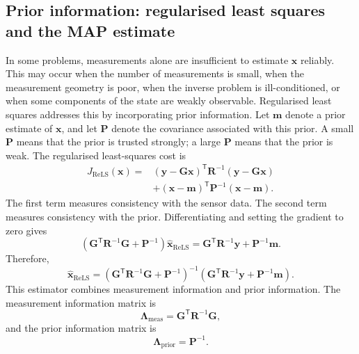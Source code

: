 \documentclass[11pt,oneside,openany]{book}
\begin{document}
\subsection{Prior information: regularised least squares and the MAP estimate}
In some problems, measurements alone are insufficient to estimate $\mathbf{x}$ reliably. This may occur when the number of measurements is small, when the measurement geometry is poor, when the inverse problem is ill-conditioned, or when some components of the state are weakly observable. Regularised least squares addresses this by incorporating prior information. Let $\mathbf{m}$ denote a prior estimate of $\mathbf{x}$, and let $\mathbf{P}$ denote the covariance associated with this prior. A small $\mathbf{P}$ means that the prior is trusted strongly; a large $\mathbf{P}$ means that the prior is weak. The regularised least-squares cost is
\begin{align}
J_{\mathrm{ReLS}}(\mathbf{x})
=&
\left(
\mathbf{y}
-
\mathbf{G}\mathbf{x}
\right)^{\mathsf T}
\mathbf{R}^{-1}
\left(
\mathbf{y}
-
\mathbf{G}\mathbf{x}
\right) \nonumber \\
&+
\left(
\mathbf{x}
-
\mathbf{m}
\right)^{\mathsf T}
\mathbf{P}^{-1}
\left(
\mathbf{x}
-
\mathbf{m}
\right).
\end{align}
The first term measures consistency with the sensor data. The second term measures consistency with the prior. Differentiating and setting the gradient to zero gives
\begin{equation}
\left(
\mathbf{G}^{\mathsf T}
\mathbf{R}^{-1}
\mathbf{G}
+
\mathbf{P}^{-1}
\right)
\widehat{\mathbf{x}}_{\mathrm{ReLS}}
=
\mathbf{G}^{\mathsf T}
\mathbf{R}^{-1}
\mathbf{y}
+
\mathbf{P}^{-1}
\mathbf{m}.
\end{equation}
Therefore,
\begin{equation}
\widehat{\mathbf{x}}_{\mathrm{ReLS}}
=
\left(
\mathbf{G}^{\mathsf T}
\mathbf{R}^{-1}
\mathbf{G}
+
\mathbf{P}^{-1}
\right)^{-1}
\left(
\mathbf{G}^{\mathsf T}
\mathbf{R}^{-1}
\mathbf{y}
+
\mathbf{P}^{-1}
\mathbf{m}
\right).
\end{equation}
This estimator combines measurement information and prior information. The measurement information matrix is
\begin{equation}
\mathbf{\Lambda}_{\mathrm{meas}}
=
\mathbf{G}^{\mathsf T}
\mathbf{R}^{-1}
\mathbf{G},
\end{equation}
and the prior information matrix is
\begin{equation}
\mathbf{\Lambda}_{\mathrm{prior}}
=
\mathbf{P}^{-1}.
\end{equation}
\end{document}
